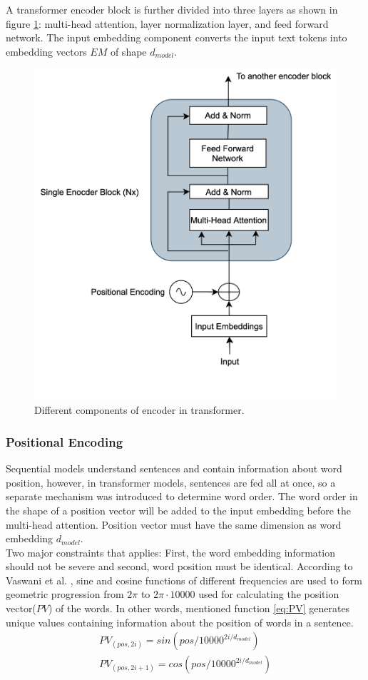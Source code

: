 \documentclass[%
	BCOR=8mm, %
	DIV=12,
	toc=bibliography, %
	toc=listof, %
	oneside, %
	egregdoesnotlikesansseriftitles, %
	]{scrbook}
\begin{document}
A transformer encoder block is further divided into three layers as shown in figure \ref{diag:EncoderArch}: multi-head attention, layer normalization layer, and feed forward network. The input embedding component converts the input text tokens into embedding vectors $EM$ of shape $d_{model}$.
\begin{figure}[H]
\centering
\includegraphics[width=.60\textwidth]{img/EncoderArch.png}
\caption[Different components of encoder in transformer]{Different components of encoder in transformer.}
\label{diag:EncoderArch}
\end{figure}
\subsubsection{Positional Encoding}
Sequential models understand sentences and contain information about word position, however, in transformer models, sentences are fed all at once, so a separate mechanism was introduced to determine word order. The word order in the shape of a position vector will be added to the input embedding before the multi-head attention. Position vector must have the same dimension as word embedding $d_{model}$.\\
Two major constraints that applies: First, the word embedding information should not be severe and second, word position must be identical. According to Vaswani et al. \cite{vaswani_attention_2017}, sine and cosine functions of different frequencies are used to form geometric progression from  $2\pi$ to $2\pi \cdot 10000$ used for calculating the position vector($PV$) of the words. In other words, mentioned function \ref{eq:PV} generates unique values containing information about the position of words in a sentence.
\begin{equation}
\begin{aligned}
    PV_{(pos,2i)}=sin(pos/10000^{2i/d_{model}})\\
    PV_{(pos,2i+1)}=cos(pos/10000^{2i/d_{model}})
    \label{eq:PV}
\end{aligned}
\end{equation}
\end{document}
